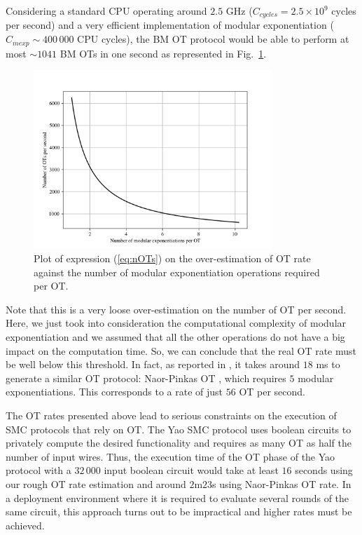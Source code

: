 Considering a standard CPU operating around $2.5$ GHz ($C_{cycles} = 2.5\times 10^9 $ cycles per second) and a very efficient implementation of modular exponentiation \cite{G11} ($C_{mexp} \sim 400\,000$ CPU cycles), the BM OT protocol would be able to perform at most $\sim 1041$ BM OTs in one second as represented in Fig.~\ref{fig:nOTsplot}.
\begin{figure}[]
\centering
\includegraphics[width=0.8\textwidth]{Chapter_QuantumAndClassicalObliviousTransfer/nOTperSeccond.png}
\caption{Plot of expression (\ref{eq:nOTs}) on the over-estimation of OT rate against the number of modular exponentiation operations required per OT.}
\label{fig:nOTsplot}
\end{figure}
Note that this is a very loose over-estimation on the number of OT per second. Here, we just took into consideration the computational complexity of modular exponentiation and we assumed that all the other operations do not have a big impact on the computation time. So, we can conclude that the real OT rate must be well below this threshold. In fact, as reported in \cite{ALSZ13}, it takes around $18$ ms to generate a similar OT protocol: Naor-Pinkas OT \cite{NP01}, which requires $5$ modular exponentiations. This corresponds to a rate of just $56$ OT per second.

The OT rates presented above lead to serious constraints on the execution of SMC protocols that rely on OT. The Yao SMC protocol \cite{Yao82} uses boolean circuits to privately compute the desired functionality and requires as many OT as half the number of input wires. Thus, the execution time of the OT phase of the Yao protocol with a $32\, 000$ input boolean circuit would take at least $16$ seconds using our rough  OT rate estimation and around $2$m$23$s using Naor-Pinkas OT rate. In a deployment environment where it is required to evaluate several rounds of the same circuit, this approach turns out to be impractical and higher rates must be achieved.

